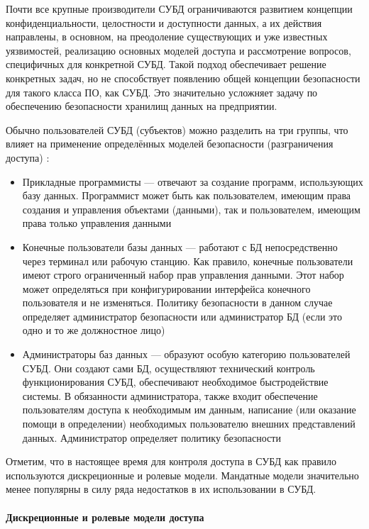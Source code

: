 Почти все крупные производители СУБД ограничиваются развитием концепции конфиденциальности, целостности
и доступности данных, а их действия направлены, в основном, на преодоление существующих и уже известных
уязвимостей, реализацию основных моделей доступа и рассмотрение вопросов, специфичных для конкретной СУБД.
Такой подход обеспечивает решение конкретных задач, но не способствует появлению общей концепции
безопасности для такого класса ПО, как СУБД. Это значительно усложняет задачу по обеспечению безопасности
хранилищ данных на предприятии.

Обычно пользователей СУБД (субъектов) можно разделить на три группы, что влияет на применение определённых
моделей безопасности (разграничения доступа) \autocite{CitForumSafeDB}:
\begin{itemize}
    \item Прикладные программисты --- отвечают за создание программ, использующих базу данных. Программист
    может быть как пользователем, имеющим права создания и управления объектами (данными), так и пользователем,
    имеющим права только управления данными

    \item Конечные пользователи базы данных --- работают с БД непосредственно через терминал или рабочую станцию.
    Как правило, конечные пользователи имеют строго ограниченный набор прав управления данными. Этот набор
    может определяться при конфигурировании интерфейса конечного пользователя и не изменяться. Политику
    безопасности в данном случае определяет администратор безопасности или администратор БД (если это одно и
    то же должностное лицо)

    \item Администраторы баз данных --- образуют особую категорию пользователей СУБД. Они создают сами БД,
    осуществляют технический контроль функционирования СУБД, обеспечивают необходимое быстродействие системы.
    В обязанности администратора, также входит обеспечение пользователям доступа к необходимым им данным,
    написание (или оказание помощи в определении) необходимых пользователю внешних представлений данных.
    Администратор определяет политику безопасности
\end{itemize}

Отметим, что в настоящее время для контроля доступа в СУБД как правило используются дискреционные и ролевые
модели. Мандатные модели значительно менее популярны в силу ряда недостатков в их использовании в СУБД.

\paragraph{Дискреционные и ролевые модели доступа}


